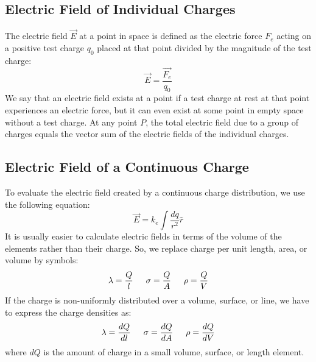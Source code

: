 \documentclass{article}
\begin{document}
\subsection{Electric Field of Individual Charges}
The electric field $\vec{E}$ at a point in space is defined as the electric force $F_e$ acting on a positive test charge $q_0$ placed at that point divided by the magnitude of the test charge:
\[
\vec{E}=\frac{\vec{F_e}}{q_0}
\]
We say that an electric field exists at a point if a test charge at rest at that point experiences an electric force, but it can even exist at some point in empty space without a test charge. At any point $P$, the total electric field due to a group of charges equals the vector sum of the electric fields of the individual charges.

\subsection{Electric Field of a Continuous Charge}
To evaluate the electric field created by a continuous charge distribution, we use the following equation:
\[
\vec{E}=k_e\int\frac{dq}{r^2}\hat{r}
\]
It is usually easier to calculate electric fields in terms of the volume of the elements rather than their charge. So, we replace charge per unit length, area, or volume by symbols:
\[
\lambda=\frac{Q}{l} \indent
\sigma=\frac{Q}{A} \indent
\rho=\frac{Q}{V}
\]
If the charge is non-uniformly distributed over a volume, surface, or line, we have to express the charge densities as:
\[
\lambda=\frac{dQ}{dl} \indent
\sigma=\frac{dQ}{dA} \indent
\rho=\frac{dQ}{dV}
\]
where $dQ$ is the amount of charge in a small volume, surface, or length element.
\end{document}
